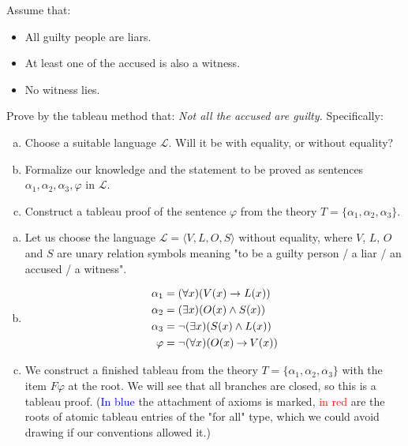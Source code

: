        
\begin{problem}

    Assume that:
    \begin{itemize}\it
        \item All guilty people are liars.
        \item At least one of the accused is also a witness.
        \item No witness lies.
    \end{itemize}

    Prove by the tableau method that: {\it Not all the accused are guilty.} Specifically:
    \begin{enumerate}[(a)]
        \item Choose a suitable language $\mathcal L$. Will it be with equality, or without equality?        
        \item Formalize our knowledge and the statement to be proved as sentences $\alpha_1,\alpha_2,\alpha_3,\varphi$ in $\mathcal L$.
        \item Construct a tableau proof of the sentence $\varphi$ from the theory $T=\{\alpha_1,\alpha_2,\alpha_3\}$.
    \end{enumerate}

    \begin{solution}

        \begin{enumerate}[(a)]
            \item Let us choose the language $\mathcal L=\langle V,L,O,S\rangle$ without equality, where $V$, $L$, $O$ and $S$ are unary relation symbols meaning "to be a guilty person / a liar / an accused / a witness".
            \item 
            \begin{align*}
                \alpha_1 & = (\forall x)(V(x)\to L(x)) \\
                \alpha_2 & = (\exists x)(O(x)\land S(x)) \\
                \alpha_3 & = \neg(\exists x)(S(x)\land L(x)) \\
                \varphi & = \neg (\forall x)(O(x)\mathbin{\rightarrow} V(x))
            \end{align*}
            \item We construct a finished tableau from the theory $T=\{\alpha_1,\alpha_2,\alpha_3\}$ with the item $F\varphi$ at the root. We will see that all branches are closed, so this is a tableau proof. (\textcolor{blue}{In blue} the attachment of axioms is marked, \textcolor{red}{in red} are the roots of atomic tableau entries of the "for all" type, which we could avoid drawing if our conventions allowed it.)
            

\end{enumerate}
\end{solution}
\end{problem}
